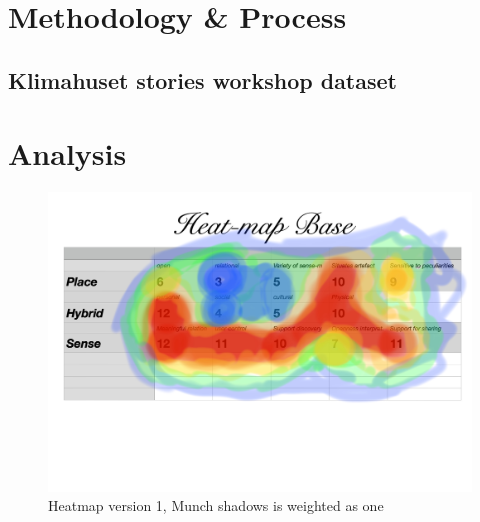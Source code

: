 \section{Methodology & Process}

\subsection{Klimahuset stories workshop dataset}



\section{Analysis}

\begin{figure}[H]
\includegraphics[width=12.5cm]{pictures/dataset/heatmap.jpg}
\caption{Heatmap version 1, Munch shadows is weighted as one}
\end{figure}


